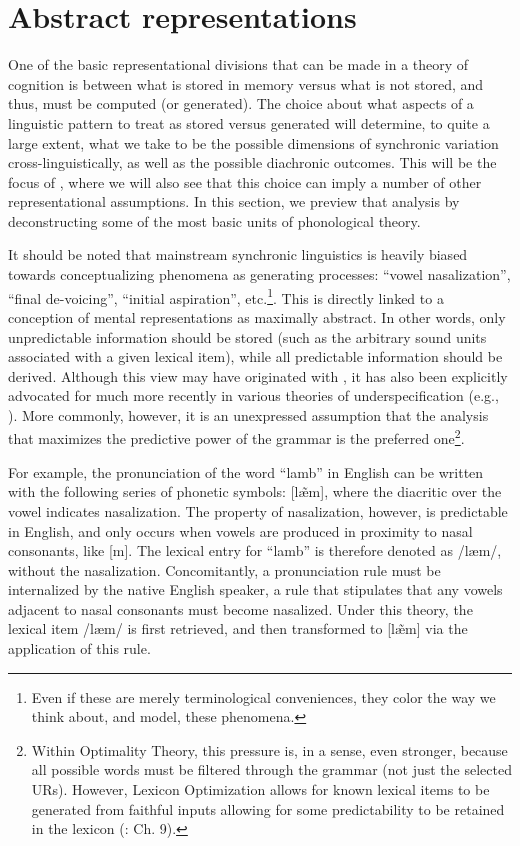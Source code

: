 \section{Abstract representations}

One of the basic representational divisions that can be made in a
theory of cognition is between what is stored in memory versus what
is not stored, and thus, must be computed (or generated). The choice
about what aspects of a linguistic pattern to treat as stored versus
generated will determine, to quite a large extent, what we take to
be the possible dimensions of synchronic variation cross-linguistically,
as well as the possible diachronic outcomes. This will be the focus
of , where we will also see that
this choice can imply a number of other representational assumptions.
In this section, we preview that analysis by deconstructing some of
the most basic units of phonological theory.

It should be noted that mainstream synchronic linguistics is heavily
biased towards conceptualizing phenomena as generating processes:
“vowel nasalization”, “final de-voicing”, “initial
aspiration”, etc.\footnote{Even if these are merely terminological conveniences, they color the
way we think about, and model, these phenomena.}. This is directly linked to a conception of mental representations
as maximally abstract. In other words, only unpredictable information
should be stored (such as the arbitrary sound units associated with
a given lexical item), while all predictable information should be
derived. Although this view may have originated with \citet{Chomsky1968},
it has also been explicitly advocated for much more recently in various
theories of underspecification (e.g., \citealt{archangeli1988aspects,Steriade1995a}).
More commonly, however, it is an unexpressed assumption that the analysis
that maximizes the predictive power of the grammar is the preferred
one\footnote{Within Optimality Theory, this pressure is, in a sense, even stronger,
because all possible words must be filtered through the grammar (not
just the selected URs). However, Lexicon Optimization allows for known
lexical items to be generated from faithful inputs allowing for some
predictability to be retained in the lexicon (\citealt{Prince2004}:
Ch. 9). }.

For example, the pronunciation of the word “lamb” in English
can be written with the following series of phonetic symbols: {[læ̃m]},
where the diacritic over the vowel indicates nasalization. The property
of nasalization, however, is predictable in English, and only occurs
when vowels are produced in proximity to nasal consonants, like {[}m{]}.
The lexical entry for “lamb” is therefore denoted as {/læm/},
without the nasalization. Concomitantly, a pronunciation rule must
be internalized by the native English speaker, a rule that stipulates
that any vowels adjacent to nasal consonants must become nasalized.
Under this theory, the lexical item {/læm/} is first retrieved,
and then transformed to {[læ̃m]} via the application of
this rule. 

